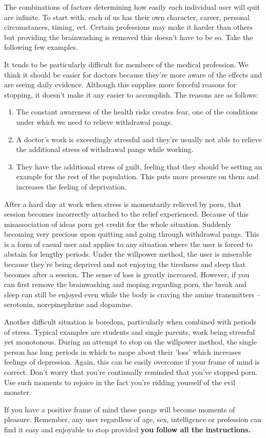 \documentclass[easypeasy.tex]{subfiles}
\begin{document}
The combinations of factors determining how easily each individual user will quit are infinite. To start with, each of us has their own character, career, personal circumstances, timing, ect. Certain professions may make it harder than others but providing the brainwashing is removed this doesn't have to be so. Take the following few examples.

It tends to be particularly difficult for members of the medical profession. We think it should be easier for doctors because they're more aware of the effects and are seeing daily evidence. Although this supplies more forceful reasons for stopping, it doesn't make it any easier to accomplish. The reasons are as follows:
  \begin{enumerate}
  \item The constant awareness of the health risks creates fear, one of the conditions under which we need to relieve withdrawal pangs.

  \item A doctor's work is exceedingly stressful and they're usually not able to relieve the additional stress of withdrawal pangs while working.

  \item They have the additional stress of guilt, feeling that they should be setting an example for the rest of the population. This puts more pressure on them and increases the feeling of deprivation.
\end{enumerate}
After a hard day at work when stress is momentarily relieved by porn, that session becomes incorrectly attached to the relief experienced. Because of this misassociation of ideas porn get credit for the whole situation. Suddenly becoming very precious upon quitting and going through withdrawal pangs. This is a form of casual user and applies to any situation where the user is forced to abstain for lengthy periods. Under the willpower method, the user is miserable because they're being deprived and not enjoying the tiredness and sleep that becomes after a session. The sense of loss is greatly increased. However, if you can first remove the brainwashing and moping regarding porn, the break and sleep can still be enjoyed even while the body is craving the amine transmitters -- serotonin, norepinephrine and dopamine.

Another difficult situation is boredom, particularly when combined with periods of stress. Typical examples are students and single parents, work being stressful yet monotonous. During an attempt to stop on the willpower method, the single person has long periods in which to mope about their 'loss' which increases feelings of depression. Again, this can be easily overcome if your frame of mind is correct. Don't worry that you're continually reminded that you've stopped porn. Use such moments to rejoice in the fact you're ridding yourself of the evil monster.

If you have a positive frame of mind these pangs will become moments of pleasure. Remember, any user regardless of age, sex, intelligence or profession can find it easy and enjoyable to stop provided \textbf{you follow all the instructions.}
\end{document}
